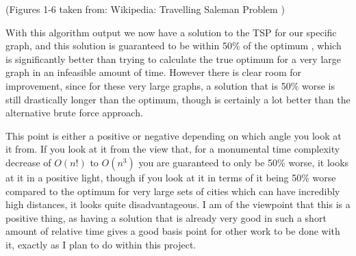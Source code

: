\documentclass[11pt,a4paper,titlepage]{article}
\begin{document}
(Figures 1-6 taken from: Wikipedia: Travelling Saleman Problem \cite{TSPWiki})

With this algorithm output we now have a solution to the TSP for our specific graph, and this solution is guaranteed to be within 50\% of the optimum \cite{ChrAlg}, which is significantly better than trying to calculate the true optimum for a very large graph in an infeasible amount of time. However there is clear room for improvement, since for these very large graphs, a solution that is 50\% worse is still drastically longer than the optimum, though is certainly a lot better than the alternative brute force approach. 

This point is either a positive or negative depending on which angle you look at it from. If you look at it from the view that, for a monumental time complexity decrease of $O(n!)$ to $O(n^3)$ you are guaranteed to only be 50\% worse, it looks at it in a positive light, though if you look at it in terms of it being 50\% worse compared to the optimum for very large sets of cities which can have incredibly high distances, it looks quite disadvantageous. I am of the viewpoint that this is a positive thing, as having a solution that is already very good in such a short amount of relative time gives a good basis point for other work to be done with it, exactly as I plan to do within this project.
\end{document}
